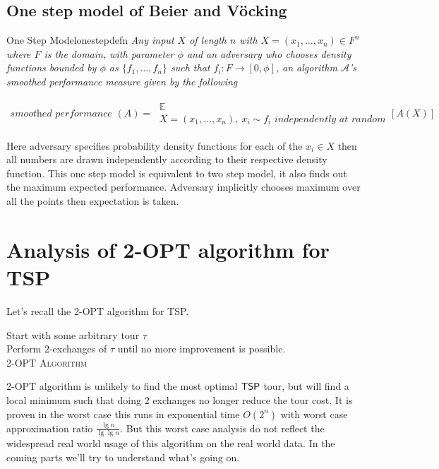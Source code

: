 \documentclass[12pt, a4paper]{article}
\newcommand{\tsp}{{\sf TSP}}
\begin{document}
\subsection{One step model of Beier and Vöcking}
\begin{define}{One Step Model}{onestepdefn}
    \textit{Any input $X$ of length $n$ with $X = (x_1, \dots, x_n) \in F^n$ where $F$ is the domain, with parameter $\phi$ and an adversary who chooses density functions bounded by $\phi$ as $\{f_1, \dots, f_n\}$ such that $f_i:F\to [0, \phi]$, an algorithm $\mathcal{A}$'s smoothed performance measure given by the following}

    \begin{align*}
        \textit{smoothed performance }(A) = \: \substack{\mathbb{E} \\ {X = (x_1, \dots, x_n), \: x_i \sim f_i \textit{ independently at random}}} \left[A(X)\right]
    \end{align*}
\end{define}

\noindent Here adversary specifies probability density functions for each of the $x_i \in X$ then all numbers are drawn independently according to their respective density function. This one step model is equivalent to two step model, it also finds out the maximum expected performance. Adversary implicitly chooses maximum over all the points then expectation is taken.

\section{Analysis of 2-{\sf OPT} algorithm for \tsp}
Let's recall the 2-{\sf OPT} algorithm for \tsp.

\begin{algorithm}[H]
    
    \BlankLine
    Start with some arbitrary tour $\tau$\\
    Perform $2$-exchanges of $\tau$ until no more improvement is possible.\\
    \caption{\textsc{2-{\sf OPT} Algorithm}}
\end{algorithm}

\noindent $2$-OPT algorithm is unlikely to find the most optimal $\tsp$ tour, but will find a local minimum such that doing $2$ exchanges no longer reduce the tour cost. It is proven in the worst case this runs in exponential time $O(2^n)$ with worst case approximation ratio $\frac{\lg n}{\lg \lg n}$. But this worst case analysis do not reflect the widespread real world usage of this algorithm on the real world data. In the coming parts we'll try to understand what's going on.
\end{document}
